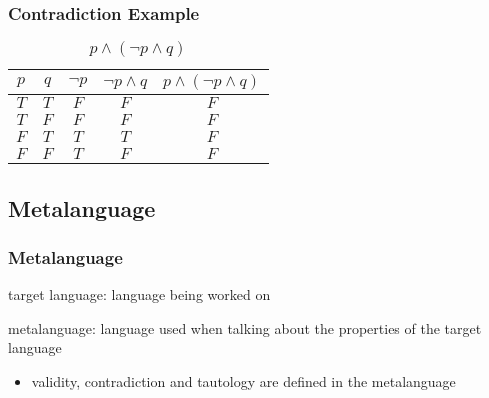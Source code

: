 \documentclass[dvipsnames]{beamer}
\begin{document}
\begin{frame}
  \frametitle{Contradiction Example}

  \begin{example}
    \begin{table}
      \caption{$p \wedge (\neg p \wedge q)$}
      \begin{tabular}{|c|c|c|c||c|}\hline
        $p$ & $q$ & $\neg p$ & $\neg p \wedge q$
            & $p \wedge (\neg p \wedge q)$\\\hline\hline
        $T$ & $T$ & $F$ & $F$ & $F$       \\\hline
        $T$ & $F$ & $F$ & $F$ & $F$       \\\hline
        $F$ & $T$ & $T$ & $T$ & $F$       \\\hline
        $F$ & $F$ & $T$ & $F$ & $F$       \\\hline
      \end{tabular}
    \end{table}
  \end{example}
\end{frame}

\subsection{Metalanguage}

\begin{frame}
  \frametitle{Metalanguage}

  \begin{definition}
    \alert{target language}: language being worked on
  \end{definition}

  \pause
  \begin{definition}
    \alert{metalanguage}: language used when talking about the properties of
      the target language
  \end{definition}

  \pause
  \begin{itemize}
    \item validity, contradiction and tautology are defined in the metalanguage
  \end{itemize}
\end{frame}
\end{document}

